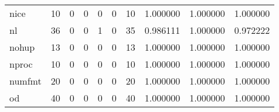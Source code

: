\begin{longtable}{lrrrrrrrrr}
nice      &                                      10 &                                                  0 &                                                  0 &                                                  0 &                                                  0 &                                                 10 &                                           1.000000 &                               1.000000 &                             1.000000 \\
nl        &                                      36 &                                                  0 &                                                  0 &                                                  1 &                                                  0 &                                                 35 &                                           0.986111 &                               1.000000 &                             0.972222 \\
nohup     &                                      13 &                                                  0 &                                                  0 &                                                  0 &                                                  0 &                                                 13 &                                           1.000000 &                               1.000000 &                             1.000000 \\
nproc     &                                      10 &                                                  0 &                                                  0 &                                                  0 &                                                  0 &                                                 10 &                                           1.000000 &                               1.000000 &                             1.000000 \\
numfmt    &                                      20 &                                                  0 &                                                  0 &                                                  0 &                                                  0 &                                                 20 &                                           1.000000 &                               1.000000 &                             1.000000 \\
od        &                                      40 &                                                  0 &                                                  0 &                                                  0 &                                                  0 &                                                 40 &                                           1.000000 &                               1.000000 &                             1.000000 \\

\end{longtable}
